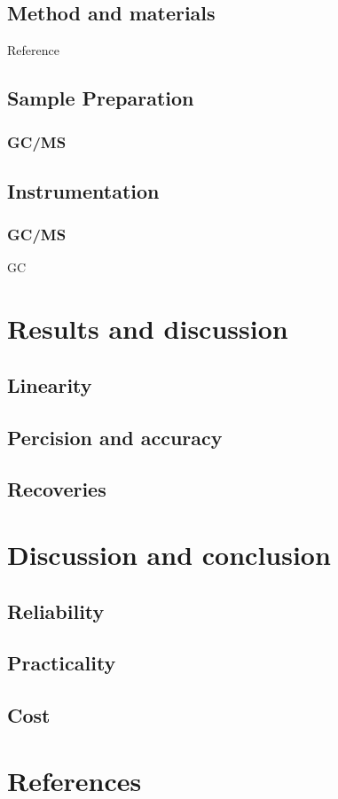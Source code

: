 \documentclass[journal=jacsat,manuscript=article]{achemso}
\begin{document}
\subsection{Method and materials}

Reference 



\subsection{Sample Preparation}
\subsubsection{GC/MS}


\subsection{Instrumentation}
\subsubsection{GC/MS}
GC

\section{Results and discussion}
\subsection{Linearity}
\subsection{Percision and accuracy}
\subsection{Recoveries}

\section{Discussion and conclusion}
\subsection{Reliability}
\subsection{Practicality}
\subsection{Cost}




\section{References}
\end{document}
